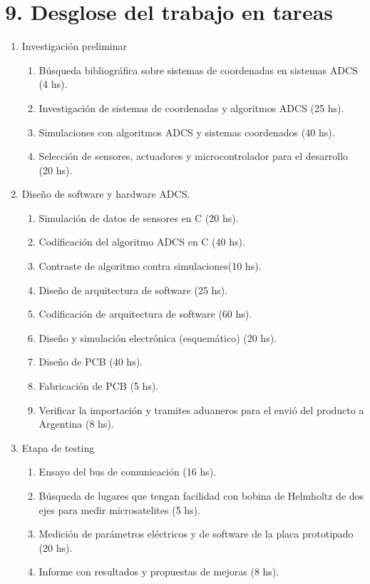 \documentclass[
11pt, %
]{charter}
\begin{document}
\section{9. Desglose del trabajo en tareas}
\label{sec:wbs}
\begin{enumerate}
	\item Investigación preliminar
		\begin{enumerate}
			\item Búsqueda bibliográfica sobre sistemas de coordenadas en sistemas ADCS (4 hs). 
			\item Investigación de sistemas de coordenadas y algoritmos ADCS (25 hs).
			\item Simulaciones con algoritmos ADCS y sistemas coordenados (40 hs).   
			\item Selección de sensores, actuadores y microcontrolador para el desarrollo (20 hs).					
		\end{enumerate}
	\item Diseño de software y hardware ADCS. 
		\begin{enumerate}
			\item Simulación de datos de sensores en C (20 hs).
			\item Codificación del algoritmo ADCS en C (40 hs). 
			\item Contraste de algoritmo contra simulaciones(10 hs). 
			\item Diseño de arquitectura de software (25 hs). 
			\item Codificación de arquitectura de software (60 hs). 
			\item Diseño y simulación electrónica (esquemático)  (20 hs). 
			\item Diseño de PCB  (40 hs). 
			\item Fabricación de PCB  (5 hs). 
			\item Verificar la importación y tramites aduaneros para el envió del producto a Argentina (8 hs). 
		\end{enumerate}
	\item Etapa de testing
		\begin{enumerate}
			\item Ensayo del bus de comunicación (16 hs). 
			\item Búsqueda de lugares que tengan facilidad con bobina de Helmholtz de dos ejes para medir microsatelites (5 hs).
			\item  Medición de parámetros eléctricos y de software de la placa prototipado (20 hs).
			\item  Informe con resultados y propuestas de mejoras (8 hs).	

\end{enumerate}
\end{enumerate}
\end{document}
